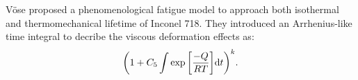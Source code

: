 V\"{o}se \cite{Vose2013} proposed a phenomenological fatigue model to approach both isothermal and thermomechanical lifetime of Inconel 718. They introduced an Arrhenius-like time integral to decribe the viscous deformation effects as:
\begin{equation}
{\left( {1 + {C_5}\int {\exp \left[ {\frac{{ - Q}}{{RT}}} \right]} {\rm{d}}t} \right)^k}.
\end{equation}


